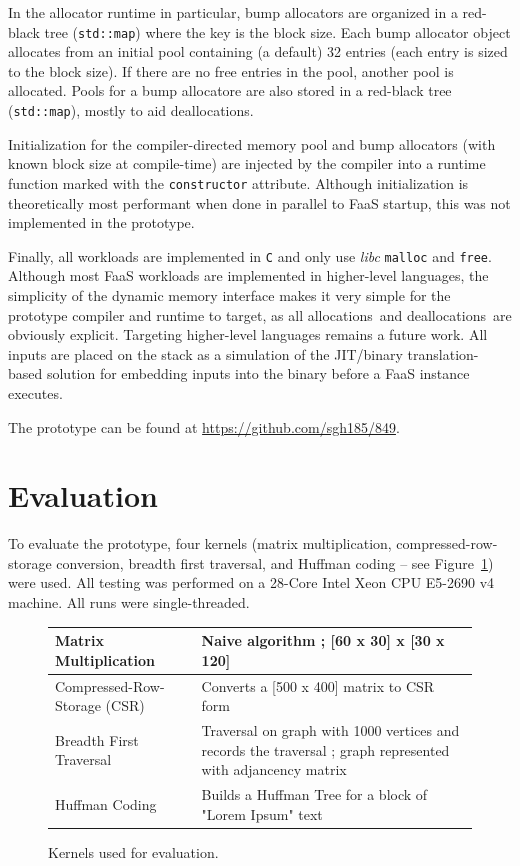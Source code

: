 \documentclass{article}
\def\ALLS{allocations}
\def\DALLS{deallocations}
\begin{document}
In the allocator runtime in particular, bump allocators are organized in a red-black tree (\texttt{std::map})
where the key is the block size. Each bump allocator object allocates from an initial pool
containing (a default) 32 entries (each entry is sized to the block size). If there are no free entries
in the pool, another pool is allocated. Pools for a bump allocatore are also stored in a 
red-black tree (\texttt{std::map}), mostly to aid \DALLS .

Initialization for the compiler-directed memory pool and bump allocators (with known block size at 
compile-time) are injected by the compiler into a runtime function marked with the \texttt{constructor}
attribute. Although initialization is theoretically most performant when done in parallel
to FaaS startup, this was not implemented in the prototype.

Finally, all workloads are implemented in \texttt{C} and only use \textit{libc} \texttt{malloc} and 
\texttt{free}. Although most FaaS workloads are implemented in higher-level languages, the 
simplicity of the dynamic memory interface makes it very simple for the prototype compiler and 
runtime to target, as all \ALLS\ and \DALLS\ are obviously explicit. Targeting higher-level 
languages remains a future work. All inputs are placed on the stack as a simulation of the 
JIT/binary translation-based solution for embedding inputs into the binary before a FaaS 
instance executes.

The prototype can be found at \href{https://github.com/sgh185/849}{https://github.com/sgh185/849}.

\section{Evaluation}
To evaluate the prototype, four kernels (matrix multiplication, compressed-row-storage conversion,
breadth first traversal, and Huffman coding -- see Figure~\ref{fig:apps}) were used. All testing
was performed on a 28-Core Intel Xeon CPU E5-2690 v4 machine. All runs were single-threaded.  

\begin{figure}
        \small
        \centering
        \begin{tabular}{ | m{5cm} | m{7cm} | } 
          \hline
            Matrix Multiplication & Naive algorithm ; [60 x 30] x [30 x 120] \\ 
          \hline
            Compressed-Row-Storage (CSR) & Converts a [500 x 400] matrix to CSR form \\ 
          \hline
            Breadth First Traversal & Traversal on graph with 1000 vertices and records the traversal ; graph represented with adjancency matrix  \\ 
          \hline
            Huffman Coding & Builds a Huffman Tree for a block of "Lorem Ipsum" text \\ 
          \hline
        \end{tabular}
        \caption{Kernels used for evaluation.}
        \label{fig:apps}
\end{figure}
\end{document}
